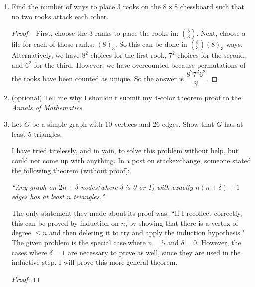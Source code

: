 \documentclass[12pt]{article}
\begin{document}
\begin{enumerate}[leftmargin=0cm,itemindent=.5cm,labelwidth=\itemindent,labelsep=0cm,align=left]
\begin{proof}
To color $W_n$, first choose a color for the center vertex.  Next, color the outside vertices (which form a subgraph isomorphic to $C_n$) with the remaining $k-1$ colors.  Therefore,
$$
\raisebox{3pt}{$\chi$}_{W_n}(k) = k \cdot \raisebox{3pt}{$\chi$}_{C_n}(k-1) = k(k-1)^{n-1} + k(k-1)(-1)^{n-1}
$$

\end{proof}

\item Find the number of ways to place 3 rooks on the $8 \times 8$ chessboard such that no two rooks attack each other.

\begin{proof}

\ First, choose the 3 ranks to place the rooks in: $\binom{8}{3}$.  Next, choose a file for each of those ranks: $(8)_3$.  So this can be done in $\binom{8}{3} (8)_3$ ways.  Alternatively, we have $8^2$ choices for the first rook, $7^2$ choices for the second, and $6^2$ for the third.  However, we have overcounted because permutations of the rooks have been counted as unique.  So the answer is $\dfrac{8^2 7^2 6^2}{3!}$.

\end{proof}

\item (optional) Tell me why I shouldn't submit my 4-color theorem proof to the \emph{Annals of Mathematics}.

\item Let $G$ be a simple graph with 10 vertices and 26 edges.  Show that $G$ has at least 5 triangles.

I have tried tirelessly, and in vain, to solve this problem without help, but could not come up with anything.  In a post on stackexchange, someone stated the following theorem (without proof):

\noindent \emph{``Any graph on $2n+\delta$ nodes(where $\delta$ is 0 or 1) with exactly $n(n+\delta)+1$ edges has at least $n$ triangles."}

The only statement they made about its proof was: ``If I recollect correctly, this can be proved by induction on $n$, by showing that there is a vertex of degree $\leq n$ and then deleting it to try and apply the induction hypothesis."  The given problem is the special case where $n = 5$ and $\delta = 0$.  However, the cases where $\delta = 1$ are necessary to prove as well, since they are used in the inductive step.  I will prove this more general theorem.

\begin{proof}


\end{proof}
\end{enumerate}
\end{document}
